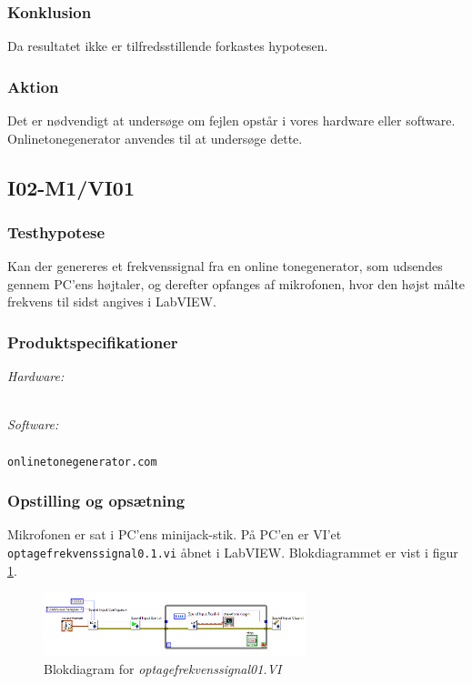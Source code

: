 			\subsubsection{Konklusion}
			Da resultatet ikke er tilfredsstillende forkastes hypotesen. 
			\subsubsection{Aktion}
			Det er nødvendigt at undersøge om fejlen opstår i vores hardware eller software. Onlinetonegenerator anvendes til at undersøge dette. 
			 
	\subsection{I02-M1/VI01} 
	
		\subsubsection{Testhypotese}
		Kan der genereres et frekvenssignal fra en online tonegenerator, som udsendes gennem PC'ens højtaler, og derefter opfanges af mikrofonen, hvor den højst målte frekvens til sidst angives i LabVIEW.  
		
		\subsubsection{Produktspecifikationer}
		
		\textit{Hardware:}\\
		\mikrofon\\
		\PC
	
		\textit{Software:}\\
		\labview\\
		\texttt{onlinetonegenerator.com}
		
		\subsubsection{Opstilling og opsætning}
		Mikrofonen er sat i PC'ens minijack-stik. På PC'en er VI'et \texttt{optagefrekvenssignal0.1.vi} åbnet i LabVIEW. Blokdiagrammet er vist i figur \ref{fig:2of01}.\\ 
		
		
		\begin{figure}[htb]
			\centering
				\includegraphics[width=3in]{of01}
				\caption{Blokdiagram for \textit{optagefrekvenssignal01.VI}}	
				\label{fig:2of01}
			\end{figure}
		
